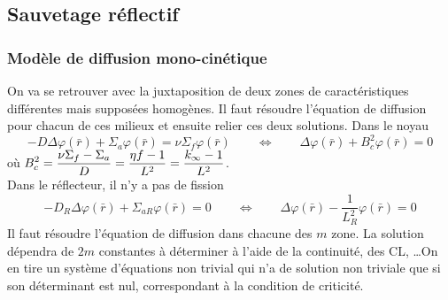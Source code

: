 \subsection{Sauvetage réflectif}
\subsubsection{Modèle de diffusion mono-cinétique}
On va se retrouver avec la juxtaposition de deux zones de caractéristiques différentes mais 
supposées homogènes. Il faut résoudre l'équation de diffusion pour chacun de ces milieux et ensuite
relier ces deux solutions. Dans le noyau 
\begin{equation}
 - D\Delta \varphi (\bar r) + {\Sigma _a}\varphi (\bar r) = \nu {\Sigma _f}\varphi (\bar r)\qquad
 \Leftrightarrow\qquad \Delta \varphi (\bar r) + B_c^2\varphi (\bar r) = 0
\end{equation}
où $\displaystyle B_c^2 = \frac{{\nu {\Sigma _f} - {\Sigma _a}}}{D} = \frac{{\eta f - 1}}{{{L^2}}} = \frac{{{k_\infty } - 1}}{{{L^2}}}$.\\

Dans le réflecteur, il n'y a pas de fission 
\begin{equation}
 - {D_R}\Delta \varphi (\bar r) + {\Sigma _{aR}}\varphi (\bar r) = 0\qquad\Leftrightarrow\qquad
\Delta \varphi (\bar r) - \frac{1}{{L_R^2}}\varphi (\bar r) = 0
\end{equation}
Il faut résoudre l'équation de diffusion dans chacune des $m$ zone. La solution dépendra de $2m$ 
constantes à déterminer à l'aide de la continuité, des CL, \dots On en tire un système d'équations 
non trivial qui n'a de solution non triviale que si son déterminant est nul, correspondant à la 
condition de criticité.\\

